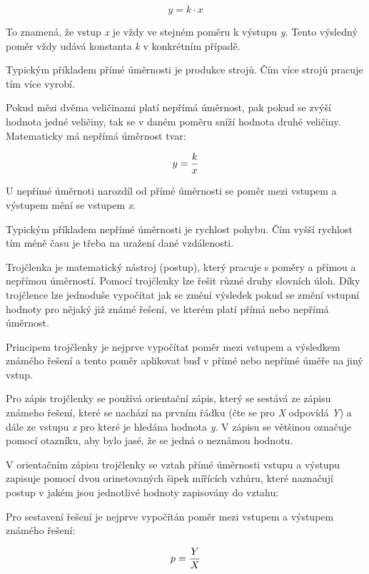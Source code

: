 $$ y = k\cdot x $$

To znamená, že vstup {\it x} je vždy ve stejném poměru k výstupu {\it y}. Tento výsledný poměr vždy udává konstanta {\it k} v konkrétním případě.

Typickým příkladem přímé úměrnosti je produkce strojů. Čím více strojů pracuje tím více vyrobí.


Pokud mězi dvěma veličinami platí nepřímá úměrnost, pak pokud se zvýší hodnota jedné veličiny, tak se v daném poměru sníží hodnota druhé veličiny. Matematicky má nepřímá úměrnost tvar:

$$ y = {k \over x} $$

U nepřímé úměrnoti narozdíl od přímé úměrnosti se poměr mezi vstupem a výstupem mění se vstupem {\it x}.

Typickým příkladem nepřímé úměrnosti je rychlost pohybu. Čím vyšší rychlost tím méně času je třeba na uražení dané vzdálenosti.


Trojčlenka je matematický nástroj (postup), který pracuje s poměry a přímou a nepřímou úměrností. Pomocí trojčlenky lze řešit různé druhy slovních úloh. Díky trojčlence lze jednoduše vypočítat jak se změní výsledek pokud se změní vstupní hodnoty pro nějaký již známé řešení, ve kterém platí přímá nebo nepřímá úměrnost.

Principem trojčlenky je nejprve vypočítat poměr mezi vstupem a výsledkem známého řešení a tento poměr aplikovat buď v přímé nebo nepřímé úměře na jiný vstup.

Pro zápis trojčlenky se používá orientační zápis, který se sestává ze zápisu známeho řešení, které se nachází na prvním řádku (čte se pro {\it X} odpovídá {\it Y}) a dále ze vstupu {\it x} pro které je hledána hodnota {\it y}. V zápisu se většinou označuje pomocí otazníku, aby bylo jasé, že se jedná o neznámou hodnotu.


V orientačním zápisu trojčlenky se vztah přímé úměrnosti vstupu a výstupu zapisuje pomocí dvou orinetovaných šipek mířících vzhůru, které naznačují postup v jakém jsou jednotlivé hodnoty zapisovány do vztahu:

\vskip 4mm
\centerline{}
\vskip 4mm

Pro sestavení řešení je nejprve vypočítán poměr mezi vstupem a výstupem známého řešení:

$$ p = {Y \over X} $$

